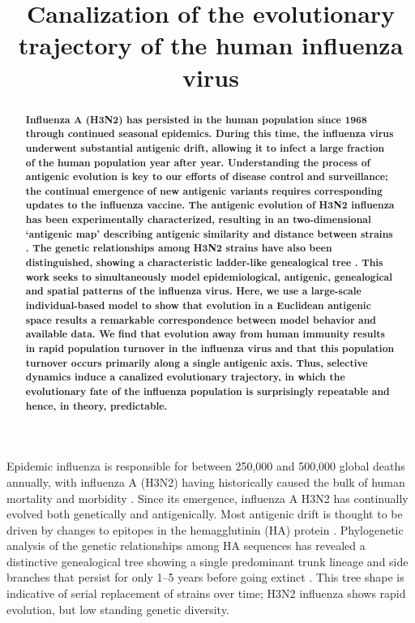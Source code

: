 \renewcommand{\thefigure}{Fig.~\arabic{figure}}
\renewcommand{\thetable}{Table~\arabic{table}}

\title{\Large \bf Canalization of the evolutionary trajectory of the human influenza virus}
\maketitle

\begin{abstract}
\noindent \bf Influenza A (H3N2) has persisted in the human population since 1968 through continued seasonal epidemics.  During this time, the influenza virus underwent substantial antigenic drift, allowing it to infect a large fraction of the human population year after year.  Understanding the process of antigenic evolution is key to our efforts of disease control and surveillance; the continual emergence of new antigenic variants requires corresponding updates to the influenza vaccine.  The antigenic evolution of H3N2 influenza has been experimentally characterized, resulting in an two-dimensional `antigenic map' describing antigenic similarity and distance between strains \cite{Smith04}.  The genetic relationships among H3N2 strains have also been distinguished, showing a characteristic ladder-like genealogical tree \cite{Fitch97}.  This work seeks to simultaneously model epidemiological, antigenic, genealogical and spatial patterns of the influenza virus.  Here, we use a large-scale individual-based model to show that evolution in a Euclidean antigenic space results a remarkable correspondence between model behavior and available data.  We find that evolution away from human immunity results in rapid population turnover in the influenza virus and that this population turnover occurs primarily along a single antigenic axis.  Thus, selective dynamics induce a canalized evolutionary trajectory, in which the evolutionary fate of the influenza population is surprisingly repeatable and hence, in theory, predictable.
\end{abstract}

Epidemic influenza is responsible for between 250,000 and 500,000 global deaths annually, with influenza A (H3N2) having historically caused the bulk of human mortality and morbidity \cite{flufactsheet}.  Since its emergence, influenza A H3N2 has continually evolved both genetically and antigenically.  Most antigenic drift is thought to be driven by changes to epitopes in the hemagglutinin (HA) protein \cite{Nelson07NatRevGenet}.  Phylogenetic analysis of the genetic relationships among HA sequences has revealed a distinctive genealogical tree showing a single predominant trunk lineage and side branches that persist for only 1--5 years before going extinct \cite{Fitch97}.  This tree shape is indicative of serial replacement of strains over time; H3N2 influenza shows rapid evolution, but low standing genetic diversity.

